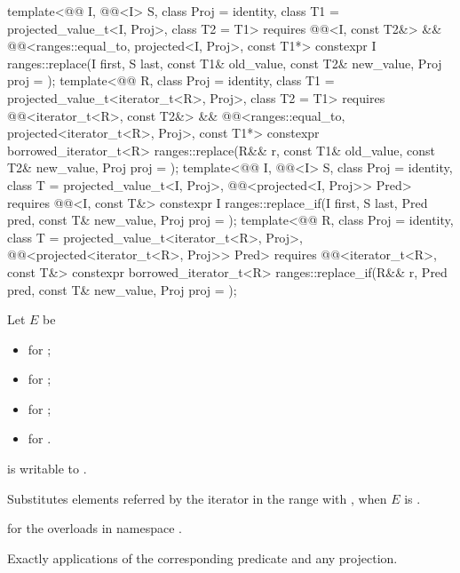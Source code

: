 \begin{itemdecl}
template<@@ I, @@<I> S, class Proj = identity,
         class T1 = projected_value_t<I, Proj>, class T2 = T1>
  requires @@<I, const T2&> &&
           @@<ranges::equal_to, projected<I, Proj>, const T1*>
  constexpr I
    ranges::replace(I first, S last, const T1& old_value, const T2& new_value, Proj proj = {});
template<@@ R, class Proj = identity,
         class T1 = projected_value_t<iterator_t<R>, Proj>, class T2 = T1>
  requires @@<iterator_t<R>, const T2&> &&
           @@<ranges::equal_to, projected<iterator_t<R>, Proj>, const T1*>
  constexpr borrowed_iterator_t<R>
    ranges::replace(R&& r, const T1& old_value, const T2& new_value, Proj proj = {});
template<@@ I, @@<I> S, class Proj = identity,
         class T = projected_value_t<I, Proj>,
         @@<projected<I, Proj>> Pred>
  requires @@<I, const T&>
  constexpr I ranges::replace_if(I first, S last, Pred pred, const T& new_value, Proj proj = {});
template<@@ R, class Proj = identity, class T = projected_value_t<iterator_t<R>, Proj>,
         @@<projected<iterator_t<R>, Proj>> Pred>
  requires @@<iterator_t<R>, const T&>
  constexpr borrowed_iterator_t<R>
    ranges::replace_if(R&& r, Pred pred, const T& new_value, Proj proj = {});
\end{itemdecl}

\begin{itemdescr}
\pnum
Let $E$ be
\begin{itemize}
\item {} for ;
\item {} for ;
\item {} for ;
\item {} for .
\end{itemize}


\pnum
\mandates
{} is writable to .

\pnum
\effects
Substitutes elements referred by the iterator 
in the range  with ,
when $E$ is .

\pnum
\returns
{} for the overloads in namespace .

\pnum
\complexity
Exactly  applications
of the corresponding predicate and any projection.
\end{itemdescr}

